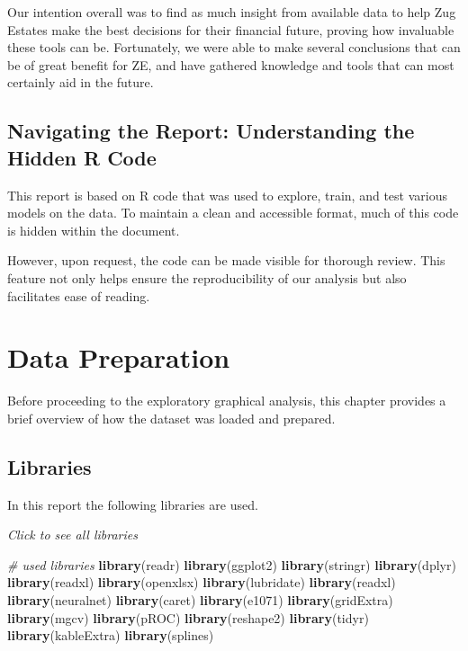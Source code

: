 \documentclass[
]{article}
\newenvironment{Shaded}{\begin{snugshade}}{\end{snugshade}}
\newcommand{\CommentTok}[1]{\textcolor[rgb]{0.56,0.35,0.01}{\textit{#1}}}
\newcommand{\FunctionTok}[1]{\textcolor[rgb]{0.13,0.29,0.53}{\textbf{#1}}}
\newcommand{\NormalTok}[1]{#1}
\begin{document}
Our intention overall was to find as much insight from available data to
help Zug Estates make the best decisions for their financial future,
proving how invaluable these tools can be. Fortunately, we were able to
make several conclusions that can be of great benefit for ZE, and have
gathered knowledge and tools that can most certainly aid in the future.

\subsection{Navigating the Report: Understanding the Hidden R
Code}\label{navigating-the-report-understanding-the-hidden-r-code}

This report is based on R code that was used to explore, train, and test
various models on the data. To maintain a clean and accessible format,
much of this code is hidden within the document.

However, upon request, the code can be made visible for thorough review.
This feature not only helps ensure the reproducibility of our analysis
but also facilitates ease of reading.

\section{Data Preparation}\label{data-preparation}

Before proceeding to the exploratory graphical analysis, this chapter
provides a brief overview of how the dataset was loaded and prepared.

\subsection{Libraries}\label{libraries}

In this report the following libraries are used.

\emph{Click to see all libraries}

\begin{Shaded}
\begin{Highlighting}[]
\CommentTok{\# used libraries}
\FunctionTok{library}\NormalTok{(readr)}
\FunctionTok{library}\NormalTok{(ggplot2)}
\FunctionTok{library}\NormalTok{(stringr)}
\FunctionTok{library}\NormalTok{(dplyr)}
\FunctionTok{library}\NormalTok{(readxl)}
\FunctionTok{library}\NormalTok{(openxlsx)}
\FunctionTok{library}\NormalTok{(lubridate)}
\FunctionTok{library}\NormalTok{(readxl)}
\FunctionTok{library}\NormalTok{(neuralnet)}
\FunctionTok{library}\NormalTok{(caret)}
\FunctionTok{library}\NormalTok{(e1071)}
\FunctionTok{library}\NormalTok{(gridExtra)}
\FunctionTok{library}\NormalTok{(mgcv)}
\FunctionTok{library}\NormalTok{(pROC)}
\FunctionTok{library}\NormalTok{(reshape2)}
\FunctionTok{library}\NormalTok{(tidyr)}
\FunctionTok{library}\NormalTok{(kableExtra)}
\FunctionTok{library}\NormalTok{(splines)}
\end{Highlighting}
\end{Shaded}
\end{document}

